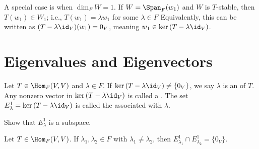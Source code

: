     \begin{example}
        A special case is when $\dim_F{W} = 1$. If $W = \Span_F{(w_1)}$ and $W$ is $T$-stable, then $T(w_1) \in W_1$; i.e., $T(w_1) = \lambda w_1$ for some $\lambda \in F$ Equivalently, this can be written as $(T-\lambda \id_V)(w_1) = 0_V$, meaning $w_1 \in \ker{(T-\lambda \id_V)}$.
    \end{example}

\section{Eigenvalues and Eigenvectors}

    \begin{definition}
        Let $T \in \Hom_F{(V,V)}$ and $\lambda \in F$. If $\ker{(T-\lambda \id_V)} \neq \{0_V\}$, we say $\lambda$ is an  of $T$. Any nonzero vector in $\ker{(T-\lambda \id_V)}$ is called a . The set $E_\lambda^1 = \ker{(T - \lambda \id_V)}$ is called the  associated with $\lambda$.
    \end{definition}

    \begin{exercise}
        Show that $E_\lambda^1$ is a subspace.
    \end{exercise}
    
    \begin{exercise}
        Let $T \in \Hom_F{(V,V)}$. If $\lambda_1,\lambda_2 \in F$ with $\lambda_1 \neq \lambda_2$, then $E_{\lambda_1}^1 \cap E_{\lambda_2}^1 = \{0_V\}$.
    \end{exercise}

